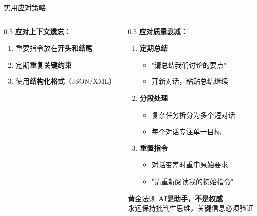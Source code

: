 \documentclass[aspectratio=169,11pt]{beamer}
\begin{document}
\begin{frame}{实用应对策略}
\begin{columns}
\begin{column}{0.5\textwidth}
            \vspace{0.3cm}
            \textbf{应对上下文遗忘：}
            \begin{enumerate}
                \item 重要指令放在\textbf{开头和结尾}
                \item 定期\textbf{重复关键约束}
                \item 使用\textbf{结构化格式}（JSON/XML）
            \end{enumerate}
        \end{column}
        \begin{column}{0.5\textwidth}
            \textbf{应对质量衰减：}
            \begin{enumerate}
                \item \textbf{定期总结}
                    \begin{itemize}
                        \item "请总结我们讨论的要点"
                        \item 开新对话，粘贴总结继续
                    \end{itemize}
                \item \textbf{分段处理}
                    \begin{itemize}
                        \item 复杂任务拆分为多个短对话
                        \item 每个对话专注单一目标
                    \end{itemize}
                \item \textbf{重置指令}
                    \begin{itemize}
                        \item 对话变差时重申原始要求
                        \item "请重新阅读我的初始指令"
                    \end{itemize}
            \end{enumerate}
            
            \vspace{0.2cm}
            \begin{alertblock}{黄金法则}
                \centering
                \textbf{AI是助手，不是权威}\\
                \small
                永远保持批判性思维，关键信息必须验证
            \end{alertblock}
        \end{column}
    \end{columns}
\end{frame}
\end{document}
